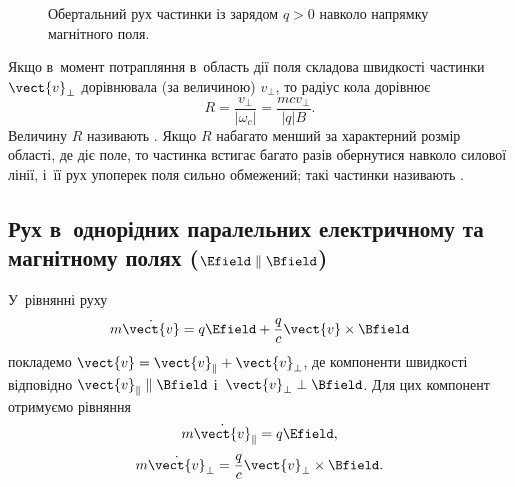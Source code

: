 \begin{figure}[h!]
	\centering
	\caption{Обертальний рух частинки із зарядом $q > 0$ навколо напрямку магнітного поля.}
	\label{tikz:cyclotron}
\end{figure}

Якщо в~момент потрапляння в~область дії поля складова швидкості частинки $\vect{v}_{\perp}$ дорівнювала (за величиною) $v_{\perp}$, то радіус кола дорівнює
\begin{equation}\label{eq:cyclotron_radius}
	R = \frac{v_{\perp}}{|\omega_c|} = \frac{mcv_{\perp}}{|q|B}.
\end{equation}
Величину $R$ називають . Якщо $R$ набагато менший за характерний розмір області, де діє поле, то частинка встигає багато разів обернутися навколо силової лінії, і~її рух упоперек поля сильно обмежений; такі частинки називають .


\subsection*{Рух в~однорідних паралельних електричному та магнітному полях ($\Efield \parallel \Bfield$)}


У~рівнянні руху
\begin{equation}\label{eq:motion_EB_parallel}
	m\dot{\vect{v}} = q\Efield + \frac{q}{c}\vect{v} \times \Bfield
\end{equation}
покладемо $\vect{v} = \vect{v}_{\parallel} + \vect{v}_{\perp}$, де компоненти швидкості відповідно $\vect{v}_{\parallel} \parallel \Bfield$ і~$\vect{v}_{\perp} \perp \Bfield$. Для цих компонент отримуємо рівняння
\begin{equation}\label{eq:v_parallel_E}
	m\dot{\vect{v}}_{\parallel} = q\Efield,
\end{equation}
\begin{equation}\label{eq:v_perp_B}
	m\dot{\vect{v}}_{\perp} = \frac{q}{c}\vect{v}_{\perp} \times \Bfield.
\end{equation}

